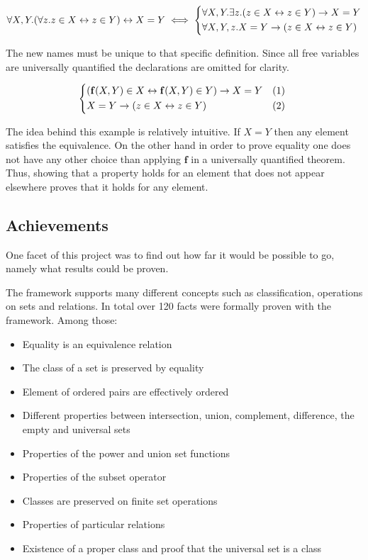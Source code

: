 \documentclass[acmlarge]{acmart}
\begin{document}
\[
\forall X, Y. (\forall z. z \in X \leftrightarrow z \in Y) \leftrightarrow X = Y \iff
\begin{dcases*}
\forall X, Y. \exists z. (z \in X \leftrightarrow z \in Y) \rightarrow X = Y \\
\forall X, Y, z. X = Y \rightarrow (z \in X \leftrightarrow z \in Y)
\end{dcases*}
\]

The new names must be unique to that specific definition. Since all free variables are universally quantified the declarations are omitted for clarity.

\[
\begin{dcases*}
(\mathbf{f}(X, Y) \in X \leftrightarrow \mathbf{f}(X, Y) \in Y) \rightarrow X = Y & (1) \\
X = Y \rightarrow (z \in X \leftrightarrow z \in Y) & (2)
\end{dcases*}
\]

The idea behind this example is relatively intuitive. If $X = Y$ then any element satisfies the equivalence. On the other hand in order to prove equality one does not have any other choice than applying $\mathbf{f}$ in a universally quantified theorem. Thus, showing that a property holds for an element that does not appear elsewhere proves that it holds for any element.

\subsection{Achievements}

One facet of this project was to find out how far it would be possible to go, namely what results could be proven.

The framework supports many different concepts such as classification, operations on sets and relations. In total over 120 facts were formally proven with the framework. Among those:

\begin{itemize}
  \item Equality is an equivalence relation
  \item The class of a set is preserved by equality
  \item Element of ordered pairs are effectively ordered
  \item Different properties between intersection, union, complement, difference, the empty and universal sets
  \item Properties of the power and union set functions
  \item Properties of the subset operator
  \item Classes are preserved on finite set operations
  \item Properties of particular relations
  \item Existence of a proper class and proof that the universal set is a class
\end{itemize}
\end{document}
